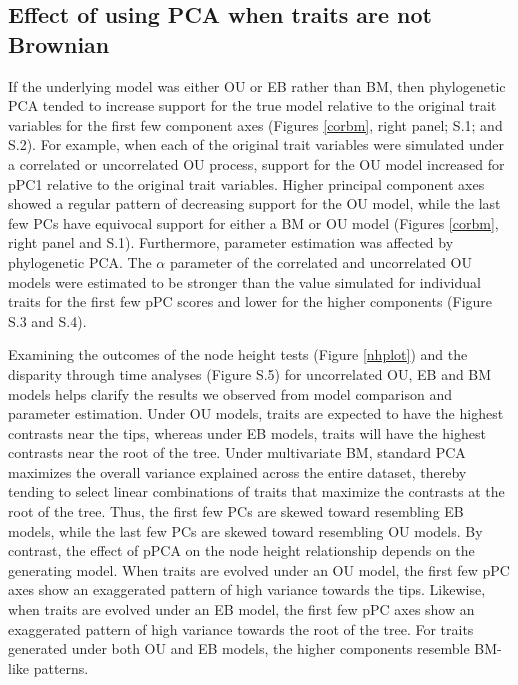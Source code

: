 \documentclass[a4paper,11pt]{article}
\begin{document}
\subsection{Effect of using PCA when traits are not Brownian}
If the underlying model was either OU or EB rather than BM, then phylogenetic PCA tended to increase support for the true model relative to the original trait variables for the first few component axes (Figures \ref{corbm}, right panel; S.1; and S.2). For example, when each of the original trait variables were simulated under a correlated or uncorrelated OU process, support for the OU model increased for pPC1 relative to the original trait variables. Higher principal component axes showed a regular pattern of decreasing support for the OU model, while the last few PCs have equivocal support for either a BM or OU model (Figures \ref{corbm}, right panel and S.1). Furthermore, parameter estimation was affected by phylogenetic PCA. The $\alpha$ parameter of the correlated and uncorrelated OU models were estimated to be stronger than the value simulated for individual traits for the first few pPC scores and lower for the higher components (Figure S.3 and S.4). 

Examining the outcomes of the node height tests (Figure \ref{nhplot}) and the disparity through time analyses (Figure S.5) for uncorrelated OU, EB and BM models helps clarify the results we observed from model comparison and parameter estimation. Under OU models, traits are expected to have the highest contrasts near the tips, whereas under EB models, traits will have the highest contrasts near the root of the tree. Under multivariate BM, standard PCA maximizes the overall variance explained across the entire dataset, thereby tending to select linear combinations of traits that maximize the contrasts at the root of the tree. Thus, the first few PCs are skewed toward resembling EB models, while the last few PCs are skewed toward resembling OU models. By contrast, the effect of pPCA on the node height relationship depends on the generating model. When traits are evolved under an OU model, the first few pPC axes show an exaggerated pattern of high variance towards the tips. Likewise, when traits are evolved under an EB model, the first few pPC axes show an exaggerated pattern of high variance towards the root of the tree. For traits generated under both OU and EB models, the higher components resemble BM-like patterns. 
\end{document}
